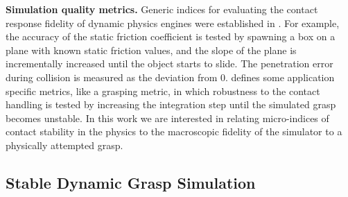 




{\bf Simulation quality metrics.}
Generic indices for evaluating the contact response fidelity of dynamic physics engines were established in \cite{Boeing07}. For example, the accuracy of the static friction coefficient is tested by spawning a box on a plane with known static friction values, and the slope of the plane is incrementally increased until the object starts to slide.  The penetration error during collision is measured as the deviation from 0.  \cite{Erez15} defines some application specific metrics, like a grasping metric, in which robustness to the contact handling is tested by increasing the integration step until the simulated grasp becomes unstable.  In this work we are interested in relating micro-indices of contact stability in the physics to the macroscopic fidelity of the simulator to a physically attempted grasp.

\subsection{Stable Dynamic Grasp Simulation}
\label{methods}

